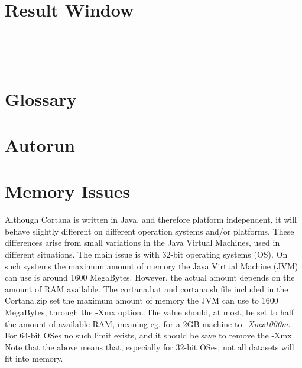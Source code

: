 \documentclass{article}
\begin{document}
\section{Result Window}

\appendix
\clearpage
~\vfill


\vfill~
\clearpage

\section{Glossary}

\section{Autorun}

\section{Memory Issues}
\label{sec:memory}

Although Cortana is written in Java, and therefore platform independent, it will behave slightly different on different operation systems and/or platforms.
These differences arise from small variations in the Java Virtual Machines, used in different situations.
The main issue is with 32-bit operating systems (OS).
On such systems the maximum amount of memory the Java Virtual Machine (JVM) can use is around 1600 MegaBytes.
However, the actual amount depends on the amount of RAM available.
The cortana.bat and cortana.sh file included in the Cortana.zip set the maximum amount of memory the JVM can use to 1600 MegaBytes, through the -Xmx option.
The value should, at most, be set to half the amount of available RAM, meaning eg. for a 2GB machine to \emph{-Xmx1000m}.
For 64-bit OSes no such limit exists, and it should be save to remove the -Xmx.
Note that the above means that, especially for 32-bit OSes, not all datasets will fit into memory.
\end{document}

